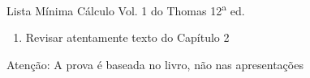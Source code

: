 \begin{frame}{Lista Mínima}
  Cálculo Vol. 1 do Thomas 12\textsuperscript{a} ed.
  \begin{enumerate}
    \item Revisar atentamente texto do Capítulo 2
  \end{enumerate}
  \vfill
  Atenção: A prova é baseada no livro, não nas apresentações
\end{frame}


